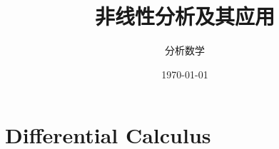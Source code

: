 \documentclass[11pt]{ctexart}
\begin{document}
\title{非线性分析及其应用}
\author{分析数学}
\date{\today}
\maketitle
\tableofcontents

\newtheorem{theorem}{定理}[section]
\newtheorem{definition}{定义}[section]
\newtheorem{lemma}{引理}[section]
\newtheorem{corollary}{推论}[section]
\newtheorem{proposition}{命题}[section]
\newtheorem{example}{例}[section]
\newtheorem{remark}{注}[section]
\newtheorem{property}{性质}[section]
\newcommand{\supp}{\operatorname{supp}}
\newcommand{\Frechet}{\textnormal{Fr\'echet}}
\newcommand{\Gateaux}{\textnormal{G\^ateaux}}
\makeatletter
\newcommand{\averageint}{\Xint-}
\def\Xint#1{%
  \mathchoice
  {\XXint\displaystyle\textstyle{#1}}%
  {\XXint\textstyle\scriptstyle{#1}}%
  {\XXint\scriptstyle\scriptscriptstyle{#1}}%
  {\XXint\scriptscriptstyle\scriptscriptstyle{#1}}%
  \!\int
}
\def\XXint#1#2#3{%
  \setbox0=\hbox{$#1{#2#3}{\int}$}%
  \vcenter{\hbox{$#2#3$}}\kern-.52\wd0
}
\makeatother

\newpage
\section{Differential Calculus}
\end{document}
